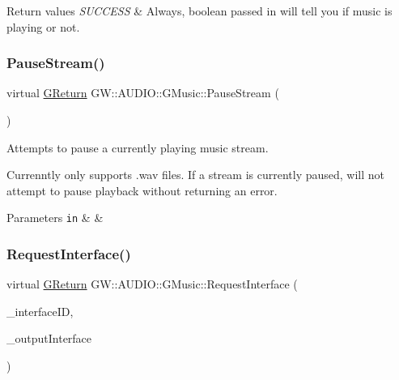 \begin{DoxyRetVals}{Return values}
{\em S\+U\+C\+C\+E\+SS} & Always, boolean passed in will tell you if music is playing or not. \\
\hline
\end{DoxyRetVals}
\mbox{\label{class_g_w_1_1_a_u_d_i_o_1_1_g_music_a6a7a4efcf2d54bcf53429cedd7687e73}} 
\subsubsection{\texorpdfstring{Pause\+Stream()}{PauseStream()}}
{\footnotesize\ttfamily virtual \mbox{\hyperlink{namespace_g_w_a67a839e3df7ea8a5c5686613a7a3de21}{G\+Return}} G\+W\+::\+A\+U\+D\+I\+O\+::\+G\+Music\+::\+Pause\+Stream (\begin{DoxyParamCaption}{ }\end{DoxyParamCaption})\hspace{0.3cm}{\ttfamily [pure virtual]}}



Attempts to pause a currently playing music stream. 

Currenntly only supports .wav files. If a stream is currently paused, will not attempt to pause playback without returning an error.


\begin{DoxyParams}[1]{Parameters}
\mbox{\tt in}  & {\em } & \\
\hline
\end{DoxyParams}
\mbox{\label{class_g_w_1_1_a_u_d_i_o_1_1_g_music_a45b07d7915cfe61ab27338c42b78dcfb}} 
\subsubsection{\texorpdfstring{Request\+Interface()}{RequestInterface()}}
{\footnotesize\ttfamily virtual \mbox{\hyperlink{namespace_g_w_a67a839e3df7ea8a5c5686613a7a3de21}{G\+Return}} G\+W\+::\+A\+U\+D\+I\+O\+::\+G\+Music\+::\+Request\+Interface (\begin{DoxyParamCaption}\item[{const \mbox{\hyperlink{struct_g_w_1_1_g_u_u_i_i_d}{G\+U\+U\+I\+ID}} \&}]{\+\_\+interface\+ID,  }\item[{void $\ast$$\ast$}]{\+\_\+output\+Interface }\end{DoxyParamCaption})\hspace{0.3cm}{\ttfamily [pure virtual]}}




